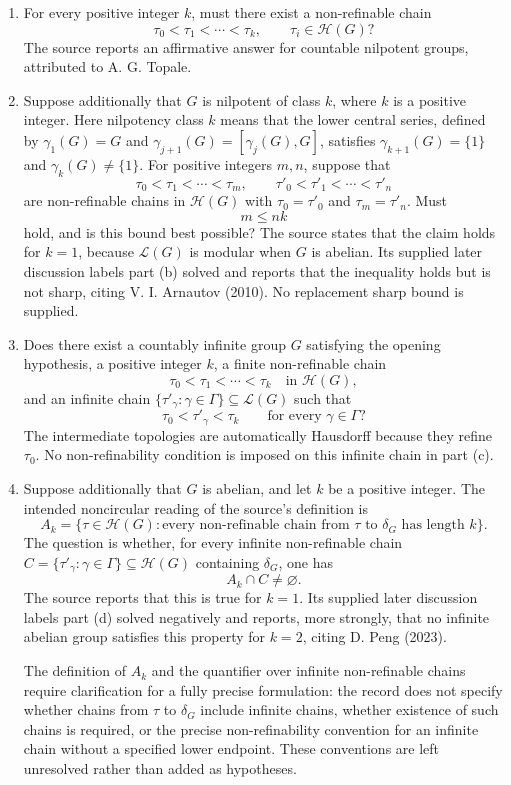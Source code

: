 \documentclass[11pt]{article}
\begin{document}
\begin{enumerate}
\item[(a)] For every positive integer \(k\), must there exist a non-refinable chain
\[
\tau_0<\tau_1<\cdots<\tau_k,
\qquad \tau_i\in\mathcal H(G)?
\]
The source reports an affirmative answer for countable nilpotent groups, attributed to A. G. Topale.

\item[(b)] Suppose additionally that \(G\) is nilpotent of class \(k\), where \(k\) is a positive integer. Here nilpotency class \(k\) means that the lower central series, defined by \(\gamma_1(G)=G\) and \(\gamma_{j+1}(G)=[\gamma_j(G),G]\), satisfies \(\gamma_{k+1}(G)=\{1\}\) and \(\gamma_k(G)\neq\{1\}\). For positive integers \(m,n\), suppose that
\[
\tau_0<\tau_1<\cdots<\tau_m,
\qquad
\tau'_0<\tau'_1<\cdots<\tau'_n
\]
are non-refinable chains in \(\mathcal H(G)\) with \(\tau_0=\tau'_0\) and \(\tau_m=\tau'_n\). Must
\[
m\leq nk
\]
hold, and is this bound best possible? The source states that the claim holds for \(k=1\), because \(\mathcal L(G)\) is modular when \(G\) is abelian. Its supplied later discussion labels part (b) solved and reports that the inequality holds but is not sharp, citing V. I. Arnautov (2010). No replacement sharp bound is supplied.

\item[(c)] Does there exist a countably infinite group \(G\) satisfying the opening hypothesis, a positive integer \(k\), a finite non-refinable chain
\[
\tau_0<\tau_1<\cdots<\tau_k
\quad\text{in }\mathcal H(G),
\]
and an infinite chain \(\{\tau'_\gamma:\gamma\in\Gamma\}\subseteq\mathcal L(G)\) such that
\[
\tau_0<\tau'_\gamma<\tau_k
\qquad\text{for every }\gamma\in\Gamma?
\]
The intermediate topologies are automatically Hausdorff because they refine \(\tau_0\). No non-refinability condition is imposed on this infinite chain in part (c).

\item[(d)] Suppose additionally that \(G\) is abelian, and let \(k\) be a positive integer. The intended noncircular reading of the source's definition is
\[
A_k=\bigl\{\tau\in\mathcal H(G):
\text{every non-refinable chain from }\tau\text{ to }\delta_G
\text{ has length }k\bigr\}.
\]
The question is whether, for every infinite non-refinable chain \(C=\{\tau'_\gamma:\gamma\in\Gamma\}\subseteq\mathcal H(G)\) containing \(\delta_G\), one has
\[
A_k\cap C\neq\varnothing.
\]
The source reports that this is true for \(k=1\). Its supplied later discussion labels part (d) solved negatively and reports, more strongly, that no infinite abelian group satisfies this property for \(k=2\), citing D. Peng (2023).

The definition of \(A_k\) and the quantifier over infinite non-refinable chains require clarification for a fully precise formulation: the record does not specify whether chains from \(\tau\) to \(\delta_G\) include infinite chains, whether existence of such chains is required, or the precise non-refinability convention for an infinite chain without a specified lower endpoint. These conventions are left unresolved rather than added as hypotheses.
\end{enumerate}
\end{document}
